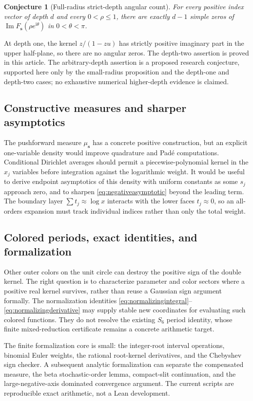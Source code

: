 \documentclass[11pt]{article}
\numberwithin{equation}{section}
\newtheorem{conjecture}[theorem]{Conjecture}
\theoremstyle{definition}
\theoremstyle{remark}
\DeclareMathOperator{\Impart}{Im}
\newcommand{\ii}{\mathrm i}
\newcommand{\sv}{\boldsymbol s}
\begin{document}
\begin{conjecture}[Full-radius strict-depth angular count]
\label{conj:depthangular}
For every positive index vector of depth $d$ and every $0<\rho\le1$,
there are exactly $d-1$ simple zeros of
$\Impart F_{\sv}(\rho e^{\ii\theta})$ in $0<\theta<\pi$.
\end{conjecture}
At depth one, the kernel $z/(1-zu)$ has strictly positive imaginary
part in the upper half-plane, so there are no angular zeros.
The depth-two assertion is proved in this article. The arbitrary-depth
assertion is a proposed research conjecture, supported here only by
the small-radius proposition and the depth-one and depth-two cases;
no exhaustive numerical higher-depth evidence is claimed.

\subsection{Constructive measures and sharper asymptotics}
The pushforward measure $\mu_{\sv}$ has a concrete positive construction,
but an explicit one-variable density would improve quadrature and
Pad\'e computations. Conditional Dirichlet averages should permit a
piecewise-polynomial kernel in the $x_j$ variables before integration
against the logarithmic weight. It would be useful to derive endpoint
asymptotics of this density with uniform constants as some $s_j$ approach
zero, and to sharpen \eqref{eq:negativeasymptotic} beyond the leading term.
The boundary layer $\sum t_j\approx\log x$ interacts with the lower
faces $t_j\approx0$, so an all-orders expansion must track individual
indices rather than only the total weight.

\subsection{Colored periods, exact identities, and formalization}
Other outer colors on the unit circle can destroy the positive sign
of the double kernel. The right question is to characterize parameter
and color sectors where a positive real kernel survives, rather than
reuse a Gaussian sign argument formally. The normalization identities
\eqref{eq:normalizingintegral}--\eqref{eq:normalizingderivative} may
supply stable new coordinates for evaluating such colored functions.
They do not resolve the existing $S_6$ period identity, whose finite
mixed-reduction certificate remains a concrete arithmetic target.

The finite formalization core is small: the integer-root interval
operations, binomial Euler weights, the rational root-kernel derivatives,
and the Chebyshev sign checker. A subsequent analytic formalization can
separate the compensated measure, the beta stochastic-order lemma,
compact-slit continuation, and the large-negative-axis dominated
convergence argument. The current scripts are reproducible exact
arithmetic, not a Lean development.
\end{document}
